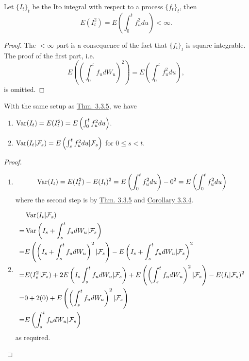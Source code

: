 \documentclass[11pt,fleqn]{book} %
\begin{document}
\begin{theorem} \label{thm:335}
Let \(\{I_t\}_t\) be the Ito integral with respect to a process \(\{f_t\}_t\), then
\[
E(I_t^2) = E\left(\int_0^t f_u^2 du\right) < \infty.
\]
\end{theorem}
\begin{proof} The \(<\infty\) part is a consequence of the fact that \(\{f_t\}_t\) is square integrable. The proof of the first part, i.e.
\[
E\left(\left(\int_0^t f_udW_u\right)^2\right) = E\left(\int_0^t f_u^2du\right),
\]
is omitted.
\end{proof}

\begin{corollary} \label{cor:336}
With the same setup as \hyperref[thm:335]{Thm. 3.3.5}, we have
\begin{enumerate}
    \item \(\operatorname{Var}(I_t) = E(I_t^2) = E\left(\int_0^t f_u^2 du\right)\).
    \item \(\operatorname{Var}(I_t|\mathcal{F}_s) = E\left(\int_s^t f_u^2 du |\mathcal{F}_s\right)\) for \(0 \leq s < t\).
\end{enumerate}
\end{corollary}
\begin{proof}
\begin{enumerate}
    \item \[ 
    \operatorname{Var}(I_t) = E(I_t^2) - E(I_t)^2 = E\left(\int_0^t f_u^2 du\right) - 0^2 = E\left(\int_0^t f_u^2du\right)
    \]
    where the second step is by \hyperref[thm:335]{Thm. 3.3.5} and \hyperref[cor:334]{Corollary 3.3.4}.
    \item \[
    \begin{aligned}
    &\operatorname{Var}(I_t | \mathcal{F}_s) \\
    = &\operatorname{Var}\left(I_s + \int_s^t f_udW_u|\mathcal{F}_s\right) \\
    = &E\left(\left(I_s + \int_s^t f_udW_u\right)^2|\mathcal{F}_s\right) - E\left(I_s + \int_s^t f_udW_u|\mathcal{F}_s\right)^2 \\
    = &E(I_s^2|\mathcal{F}_s) + 2E\left(I_s\int_s^tf_udW_u|\mathcal{F}_s\right) + E\left(\left(\int_s^t f_udW_u\right)^2|\mathcal{F}_s\right) - E(I_t|\mathcal{F}_s)^2 \\
    = &0 + 2(0) + E\left(\left(\int_s^t f_udW_u\right)^2|\mathcal{F}_s\right) \\
    = &E\left(\int_s^t f_udW_u|\mathcal{F}_s\right)
    \end{aligned}
    \]
    as required.
\end{enumerate}
\end{proof}
\end{document}
